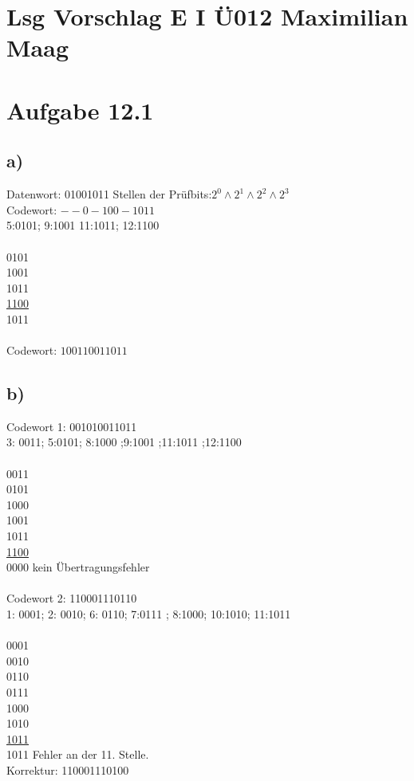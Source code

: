 \documentclass{article}
\begin{document}
	\section*{Lsg Vorschlag E I Ü012 Maximilian Maag}
	\section*{Aufgabe 12.1}
	\subsection*{a)}
	Datenwort: 01001011
	Stellen der Prüfbits:$2^0 \land 2^1 \land 2^2 \land2^3$ \\
	Codewort: $--0-100-1011$ \\
	5:0101; 9:1001 11:1011; 12:1100 \\ \\
	 0101 \\
	 1001 \\
	 1011 \\
	 \underline{1100} \\
	 1011 \\ \\
	 Codewort: $100110011011$
	\subsection*{b)}
	Codewort 1: 001010011011 \\
	3: 0011; 5:0101; 8:1000 ;9:1001 ;11:1011 ;12:1100 \\ \\
	0011 \\
	0101 \\
	1000 \\
	1001 \\
	1011 \\
	\underline{1100} \\
	0000 kein Übertragungsfehler\\ \\
	Codewort 2:  110001110110 \\
	1: 0001; 2: 0010; 6: 0110; 7:0111 ; 8:1000; 10:1010; 11:1011 \\ \\
	0001 \\
	0010 \\
	0110 \\
	0111 \\
	1000 \\
	1010 \\
	\underline{1011} \\
	1011 Fehler an der 11. Stelle. \\
	Korrektur: 110001110100
\end{document}
